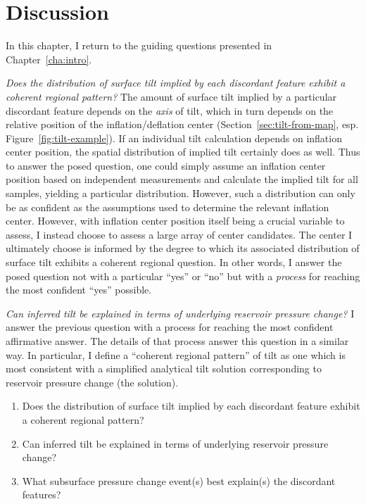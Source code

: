 \chapter{Discussion}\label{cha:discussion}

In this chapter, I return to the guiding questions presented in Chapter~\ref{cha:intro}.

\emph{Does the distribution of surface tilt implied by each discordant feature exhibit a coherent regional pattern?} The amount of surface tilt implied by a particular discordant feature depends on the \emph{axis} of tilt, which in turn depends on the relative position of the inflation/deflation center (Section~\ref{sec:tilt-from-map}, esp. Figure~\ref{fig:tilt-example}). If an individual tilt calculation depends on inflation center position, the spatial distribution of implied tilt certainly does as well. Thus to answer the posed question, one could simply assume an inflation center position based on independent measurements and calculate the implied tilt for all samples, yielding a particular distribution. However, such a distribution can only be as confident as the assumptions used to determine the relevant inflation center. However, with inflation center position itself being a crucial variable to assess, I instead choose to assess a large array of center candidates. The center I ultimately choose is informed by the degree to which its associated distribution of surface tilt exhibits a coherent regional question. In other words, I answer the posed question not with a particular ``yes'' or ``no'' but with a \emph{process} for reaching the most confident ``yes'' possible. 

\emph{Can inferred tilt be explained in terms of underlying reservoir pressure change?} I answer the previous question with a process for reaching the most confident affirmative answer. The details of that process answer this question in a similar way. In particular, I define a ``coherent regional pattern'' of tilt as one which is most consistent with a simplified analytical tilt solution corresponding to reservoir pressure change (the \textcite{mogi_relations_1958} solution).

\begin{enumerate}
    \item Does the distribution of surface tilt implied by each discordant feature exhibit a coherent regional pattern?
    \item Can inferred tilt be explained in terms of underlying reservoir pressure change?
    \item What subsurface pressure change event(s) best explain(s) the discordant features?
\end{enumerate}

